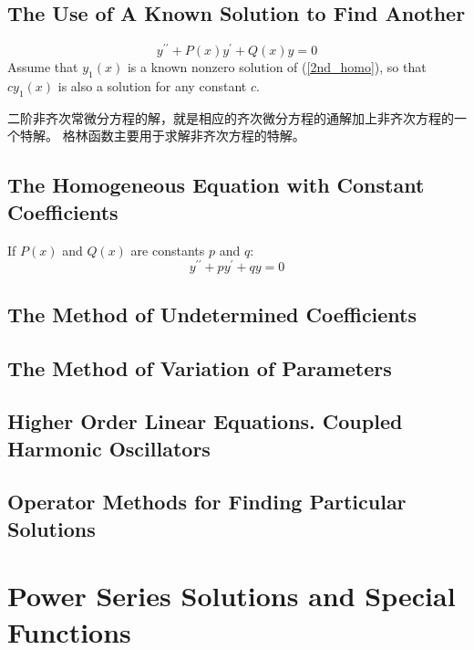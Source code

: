 \documentclass[11pt,a4paper]{article}
\begin{document}
\subsection{The Use of A Known Solution to Find Another}
\begin{equation}
y^{\prime\prime} +P(x) y^\prime +Q(x) y = 0
\label{2nd_homo}
\end{equation}
Assume that $y_1(x)$ is a known nonzero solution of (\ref{2nd_homo}), so that $cy_1(x)$ is also a solution for any constant $c$. 


二阶非齐次常微分方程的解，就是相应的齐次微分方程的通解加上非齐次方程的一个特解。
格林函数主要用于求解非齐次方程的特解。

\subsection{The Homogeneous Equation with Constant Coefficients}
If $P(x)$ and $Q(x)$ are constants $p$ and $q$:
\begin{equation}
y^{\prime\prime} + p y^\prime +q y = 0
\end{equation}


\subsection{The Method of Undetermined Coefficients}

\subsection{The Method of Variation of Parameters}


\subsection{Higher Order Linear Equations. Coupled Harmonic Oscillators}



\subsection{Operator Methods for Finding Particular Solutions}



\section{Power Series Solutions and Special Functions}
\end{document}
